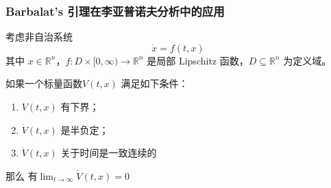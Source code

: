 \begin{frame}
  \frametitle{Barbalat's 引理在李亚普诺夫分析中的应用}

  考虑非自治系统
\[
\dot{x} = f(t,x) 
\]
其中 $x \in \mathbb{R}^n$，$f: D\times[0,\infty) \to \mathbb{R}^n$ 是局部 Lipschitz 函数，$D \subseteq \mathbb{R}^n$ 为定义域。
  
  \begin{theorem}
    如果一个标量函数$V(t,x)$ 满足如下条件：
    \begin{enumerate}
      \item $V(t,x)$ 有下界；
      \item $\dot{V}(t,x)$ 是半负定；
      \item $\dot{V}(t,x)$ 关于时间是一致连续的
    \end{enumerate}
    那么 有$\lim_{t\to\infty} \dot{V}(t,x)=0$
  \end{theorem} 
\end{frame}